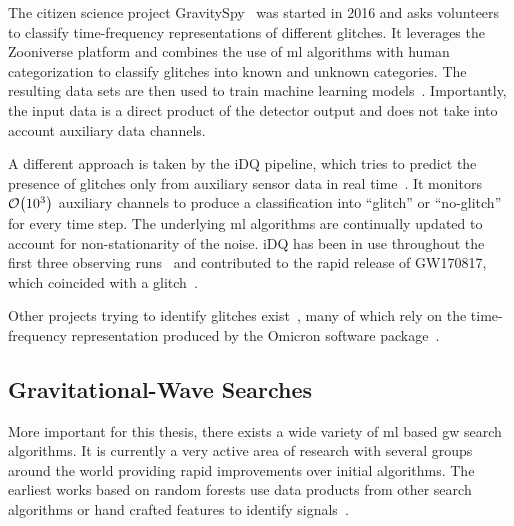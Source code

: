 The citizen science project GravitySpy~\cite{Zevin:2016qwy} was started in 2016 and asks volunteers to classify time-frequency representations of different glitches. It leverages the Zooniverse platform and combines the use of \acrshort{ml} algorithms with human categorization to classify glitches into known and unknown categories. The resulting data sets are then used to train machine learning models~\cite{Bahaadini:2018git}. Importantly, the input data is a direct product of the detector output and does not take into account auxiliary data channels.

A different approach is taken by the iDQ pipeline, which tries to predict the presence of glitches only from auxiliary sensor data in real time~\cite{Essick:2020qpo}. It monitors $\mathcal{O}{\left( 10^3 \right)}$ auxiliary channels to produce a classification into ``glitch'' or ``no-glitch'' for every time step. The underlying \acrshort{ml} algorithms are continually updated to account for non-stationarity of the noise. iDQ has been in use throughout the first three observing runs~\cite{LIGOScientific:2021djp} and contributed to the rapid release of GW170817, which coincided with a glitch~\cite{Cuoco:2020ogp}.

Other projects trying to identify glitches exist~\cite{Mukund:2016thr, Cavaglia:2018xjq, Coughlin:2019ref}, many of which rely on the time-frequency representation produced by the Omicron software package~\cite{Robinet:2020lbf}.

\subsection{Gravitational-Wave Searches}
More important for this thesis, there exists a wide variety of \acrshort{ml} based \acrshort{gw} search algorithms. It is currently a very active area of research with several groups around the world providing rapid improvements over initial algorithms. The earliest works based on random forests use data products from other search algorithms or hand crafted features to identify signals~\cite{Baker:2014eba, Kapadia:2017fhb}.


